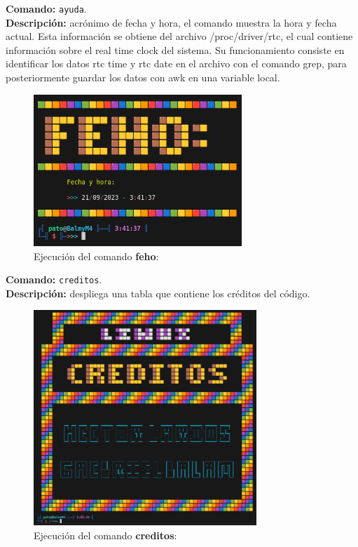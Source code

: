 \documentclass[titlepage]{article}
\begin{document}
\noindent
\textbf{Comando:} \verb|ayuda|. \\
\textbf{Descripción:} acrónimo de fecha y hora, el comando muestra la hora y fecha actual. Esta información se obtiene del archivo /proc/driver/rtc, el cual contiene información sobre el real time clock del sistema. Su funcionamiento consiste en identificar los datos rtc time y rtc date en el archivo con el comando grep, para posteriormente guardar los datos con awk en una variable local.

\begin{figure}[H]
    \centering
    \includegraphics[width=0.7\textwidth]{feho.png}
    \caption{Ejecución del comando \textbf{feho}:}
    \label{fig:ejemplo}
\end{figure}

\noindent
\textbf{Comando:} \verb|creditos|. \\
\textbf{Descripción:} despliega una tabla que contiene los créditos del código.

\begin{figure}[H]
    \centering
    \includegraphics[width=0.75\textwidth]{creditos.png}
    \caption{Ejecución del comando \textbf{creditos}:}
    \label{fig:ejemplo}
\end{figure}
\end{document}

